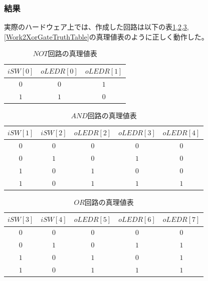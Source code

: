 \documentclass[a4paper]{jarticle}
\begin{document}
\subsubsection{結果}
実際のハードウェア上では、作成した回路は以下の表\ref{Work2NotGateTruthTable},\ref{Work2AndGateTruthTable},\ref{Work2OrGateTruthTable},\ref{Work2XorGateTruthTable}の真理値表のように正しく動作した。
\begin{table}[!h]
	\begin{center}
		\caption{$NOT$回路の真理値表}
		\label{Work2NotGateTruthTable}
		\begin{tabular}{|c|c|c|}
			\hline
			$iSW \left[ 0 \right]$	&$oLEDR \left[ 0 \right]$	&$oLEDR \left[ 1 \right]$\\	\hline\hline
			$0$			&$0$				&$1$\\				\hline
			$1$			&$1$				&$0$\\				\hline
		\end{tabular}
	\end{center}
\end{table}
\begin{table}[!h]
	\begin{center}
		\caption{$AND$回路の真理値表}
		\label{Work2AndGateTruthTable}
		\begin{tabular}{|c|c|c|c|c|}
			\hline
			$iSW \left[ 1 \right]$	&$iSW \left[ 2 \right]$	&$oLEDR \left[ 2 \right]$	&$oLEDR \left[ 3 \right]$	&$oLEDR \left[ 4 \right]$\\	\hline\hline
			$0$			&$0$			&$0$				&$0$				&$0$\\				\hline
			$0$			&$1$			&$0$				&$1$				&$0$\\				\hline
			$1$			&$0$			&$1$				&$0$				&$0$\\				\hline
			$1$			&$0$			&$1$				&$1$				&$1$\\				\hline
		\end{tabular}
	\end{center}
\end{table}
\begin{table}[!h]
	\begin{center}
		\caption{$OR$回路の真理値表}
		\label{Work2OrGateTruthTable}
		\begin{tabular}{|c|c|c|c|c|}
			\hline
			$iSW \left[ 3 \right]$	&$iSW \left[ 4 \right]$	&$oLEDR \left[ 5 \right]$	&$oLEDR \left[ 6 \right]$	&$oLEDR \left[ 7 \right]$\\	\hline\hline
			$0$			&$0$			&$0$				&$0$				&$0$\\				\hline
			$0$			&$1$			&$0$				&$1$				&$1$\\				\hline
			$1$			&$0$			&$1$				&$0$				&$1$\\				\hline
			$1$			&$0$			&$1$				&$1$				&$1$\\				\hline
		\end{tabular}
	\end{center}
\end{table}
\end{document}
